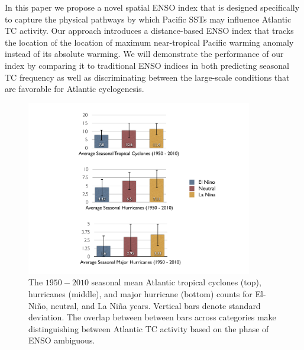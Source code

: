 \documentclass[]{article}
\begin{document}
In this paper we propose a novel spatial ENSO index that is designed specifically to capture the physical pathways by which Pacific SSTs may influence Atlantic TC activity. Our approach introduces a distance-based ENSO index that tracks the location of 
the location of maximum near-tropical Pacific warming anomaly instead of its absolute warming. We will demonstrate the performance of our index by comparing it to traditional ENSO indices in both predicting seasonal TC frequency as well as discriminating between the large-scale conditions that are favorable for Atlantic cyclogenesis.


\begin{figure}[htbp]
	\centering
		\includegraphics[height=3in]{figures/nino_nina_avg_diff.pdf}
	\caption{The $1950-2010$ seasonal mean Atlantic tropical cyclones (top), hurricanes (middle), and major hurricane (bottom) counts for El-Ni\~no, neutral, and La Ni\~na years. Vertical bars denote standard deviation. The overlap between between bars across categories make distinguishing between Atlantic TC activity based on the phase of ENSO ambiguous.}
	\label{fig:enso_bars}
\end{figure}
\end{document}
